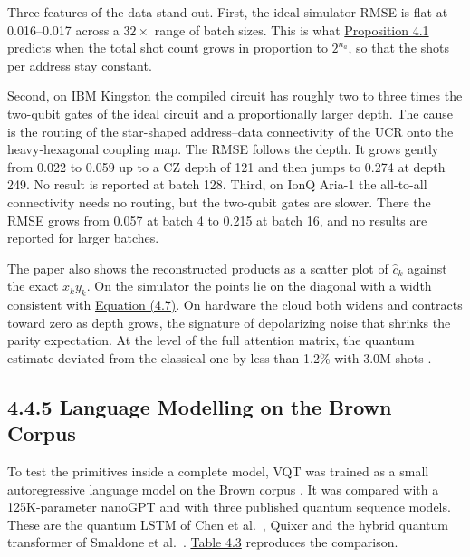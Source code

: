 \documentclass{report}
\theoremstyle{plain}
\theoremstyle{definition}
\theoremstyle{remark}
\begin{document}
Three features of the data stand out. First, the ideal-simulator RMSE is flat at 0.016--0.017 across a $32\times$ range of batch sizes. This is what \hyperref[thm:qml:vqdp-variance]{Proposition 4.1} predicts when the total shot count grows in proportion to $2^{n_a}$, so that the shots per address stay constant.

Second, on IBM Kingston the compiled circuit has roughly two to three times the two-qubit gates of the ideal circuit and a proportionally larger depth. The cause is the routing of the star-shaped address--data connectivity of the UCR onto the heavy-hexagonal coupling map. The RMSE follows the depth. It grows gently from 0.022 to 0.059 up to a CZ depth of 121 and then jumps to 0.274 at depth 249. No result is reported at batch 128. Third, on IonQ Aria-1 the all-to-all connectivity needs no routing, but the two-qubit gates are slower. There the RMSE grows from 0.057 at batch 4 to 0.215 at batch 16, and no results are reported for larger batches.

The paper also shows the reconstructed products as a scatter plot of $\hat{c}_k$ against the exact $x_k y_k$. On the simulator the points lie on the diagonal with a width consistent with \hyperref[eq:qml:vqdp-var]{Equation (4.7)}. On hardware the cloud both widens and contracts toward zero as depth grows, the signature of depolarizing noise that shrinks the parity expectation. At the level of the full attention matrix, the quantum estimate deviated from the classical one by less than 1.2\% with $3.0$M shots \cite{guo2025vqt}.

\subsection{4.4.5 Language Modelling on the Brown Corpus}\label{sec:qml:vqt:lm}

To test the primitives inside a complete model, VQT was trained as a small autoregressive language model on the Brown corpus \cite{francis1979brown}. It was compared with a 125K-parameter nanoGPT \cite{karpathy2023nanogpt} and with three published quantum sequence models. These are the quantum LSTM of Chen et al.~\cite{chen2022qlstm}, Quixer \cite{khatri2024quixer} and the hybrid quantum transformer of Smaldone et al.~\cite{smaldone2025hybridqt}. \hyperref[tab:qml:vqt-lm]{Table 4.3} reproduces the comparison.
\end{document}

